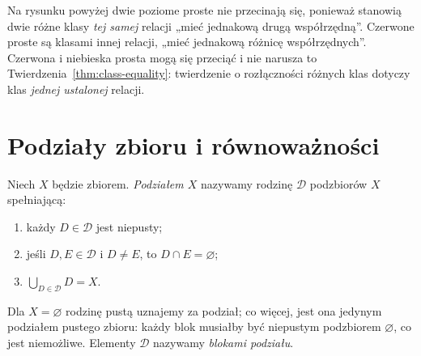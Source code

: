\begin{uwaga}
Na rysunku powyżej dwie poziome proste nie przecinają się,
ponieważ stanowią dwie różne klasy \emph{tej samej} relacji
„mieć jednakową drugą współrzędną”. Czerwone proste
są klasami innej relacji, „mieć jednakową różnicę współrzędnych”.
Czerwona i niebieska prosta mogą się przeciąć i nie narusza to
Twierdzenia~\ref{thm:class-equality}: twierdzenie o rozłączności
różnych klas dotyczy klas \emph{jednej ustalonej} relacji.
\end{uwaga}

\section{Podziały zbioru i równoważności}\label{sec:eq-partition}
\begin{definicja}\label{def:partition}
Niech $X$ będzie zbiorem. \emph{Podziałem $X$} nazywamy
rodzinę $\mathcal D$ podzbiorów $X$ spełniającą:
\begin{enumerate}[label=(\roman*)]
\item każdy $D\in\mathcal D$ jest niepusty;
\item jeśli $D,E\in\mathcal D$ i $D\ne E$, to
$D\cap E=\varnothing$;
\item $\bigcup_{D\in\mathcal D}D=X$.
\end{enumerate}
Dla $X=\varnothing$ rodzinę pustą uznajemy za podział;
co więcej, jest ona jedynym podziałem pustego zbioru: każdy
blok musiałby być niepustym podzbiorem $\varnothing$, co jest niemożliwe.
Elementy $\mathcal D$ nazywamy \emph{blokami podziału}.
\end{definicja}

